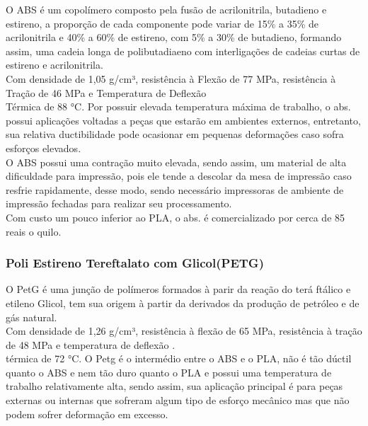 O ABS é um copolímero composto pela fusão de acrilonitrila, butadieno e estireno, a proporção de cada componente pode variar de 15\% a 35\% de acrilonitrila e 40\% a 60\% de estireno, com 5\% a 30\% de butadieno, formando assim, uma cadeia longa de polibutadiaeno com interligações de cadeias curtas de estireno e acrilonitrila. \\[0.2cm]



Com densidade de 1,05 g/cm³, resistência à Flexão de 77 MPa, resistência à Tração de 46 MPa e Temperatura de Deflexão \\[0.2cm]

Térmica de 88 °C. Por possuir elevada temperatura máxima de trabalho, o abs. possui aplicações voltadas a peças que estarão em ambientes externos, entretanto, sua relativa ductibilidade pode ocasionar em pequenas deformações caso sofra esforços elevados.
\\[0.2cm]


O ABS possui uma contração muito elevada, sendo assim, um material de alta dificuldade para impressão, pois ele tende a descolar da mesa de impressão caso resfrie rapidamente, desse modo, sendo necessário impressoras de ambiente de impressão fechadas para realizar seu processamento.\\[0.2cm]



Com custo um pouco inferior ao PLA, o abs. é comercializado por cerca de 85 reais o quilo. \\[0.2cm]





\subsubsection{Poli Estireno Tereftalato com Glicol(PETG)}



O PetG é uma junção de polímeros formados à parir da reação do terá ftálico e etileno Glicol, tem sua origem à partir da derivados da produção de petróleo e de gás natural.\\[0.2cm]





Com densidade de 1,26 g/cm³, resistência à flexão de 65 MPa, resistência à tração de 48 MPa e temperatura de deflexão .\\[0.2cm]

térmica de 72 °C. O Petg é o intermédio entre o ABS e o PLA, não é tão dúctil quanto o ABS e nem tão duro quanto o PLA e possui uma temperatura de trabalho relativamente alta, sendo assim, sua aplicação principal é para peças externas ou internas que sofreram algum tipo de esforço mecânico mas que não podem sofrer deformação em excesso. \\[0.2cm]



